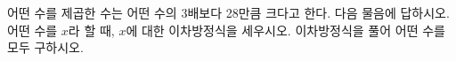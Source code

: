 어떤 수를 제곱한 수는 어떤 수의 3배보다 28만큼 크다고 한다. 다음 물음에 답하시오.
 어떤 수를 $x$라 할 때, $x$에 대한 이차방정식을 세우시오.
 이차방정식을 풀어 어떤 수를 모두 구하시오.
